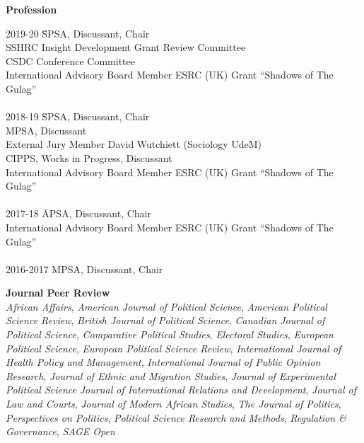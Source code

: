\documentclass[margin,line]{res}
\begin{document}
{\begin{resume}
\textbf{Profession}\\
\vspace{-3em}

\begin{tabbing}
2019-20 \=  SPSA, Discussant, Chair\\
\> SSHRC Insight Development Grant Review Committee\\
\> CSDC Conference Committee \\
\> International Advisory Board Member ESRC (UK) Grant ``Shadows of
The Gulag''\\
\\
  
2018-19 \=  SPSA, Discussant, Chair\\
\> MPSA, Discussant \\
\> External Jury Member David Wutchiett (Sociology UdeM) \\
\> CIPPS, Works in Progress, Discussant\\
\> International Advisory Board Member ESRC (UK) Grant ``Shadows of
The Gulag''\\
\\
2017-18 \=  APSA, Discussant, Chair\\
\> International Advisory Board Member ESRC (UK) Grant ``Shadows of
The Gulag''\\
\\
2016-2017 MPSA, Discussant, Chair \\
\end{tabbing}
\vspace{-2em}

\textbf{Journal Peer Review}\\
\emph{African Affairs},
\emph{American Journal of Political Science},
\emph{American Political Science Review},
\emph{British Journal of Political Science},
\emph{Canadian Journal
  of Political Science},
\emph{Comparative Political Studies},
\emph{Electoral Studies},
\emph{European Political Science},
\emph{European Political Science Review},
\emph{International Journal of Health Policy and Management},
\emph{International Journal of Public Opinion Research},
\emph{Journal of Ethnic and Migration Studies},
\emph{Journal of Experimental Political Science}
\emph{Journal of International Relations and Development},
\emph{Journal of Law and Courts},
\emph{Journal of Modern African Studies},
\emph{The Journal of Politics},
\emph{Perspectives on Politics},
\emph{Political Science Research and Methods},
\emph{Regulation \& Governance},
\emph{SAGE Open}
\par\smallskip


\end{resume}}
\end{document}
